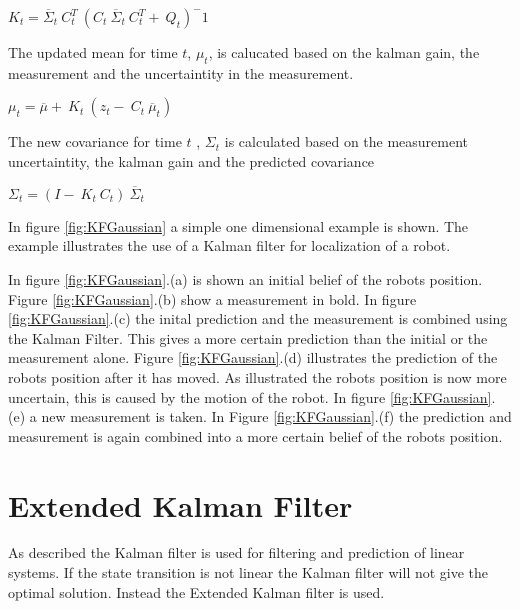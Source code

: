 \begin{center}
$K_t = \overline{\Sigma}_t \ C^T_t \ (C_t \ \overline{\Sigma}_t \ C^T_t +\ Q_t )^-1$ \\
\end{center}	

The updated mean for time $t$, $\mu_t$, is calucated based on the kalman gain, the measurement and the uncertaintity in the measurement.

\begin{center}
	$\mu_t =  \overline{\mu} + \ K_t \ (z_t- \ C_t \ \overline{\mu}_t)$ \\
\end{center}

The new covariance for time $t$ , $\Sigma_t$ is calculated based on the measurement uncertaintity, the kalman gain and the predicted covariance
\begin{center}
$\Sigma_t = (I - \ K_t \ C_t) \ \overline{\Sigma}_t$ \\
\end{center}


In figure \ref{fig:KFGaussian} a simple one dimensional example is shown. The example illustrates the use of a Kalman filter for localization of a robot. 

In figure \ref{fig:KFGaussian}.(a) is shown an initial belief of the robots position. Figure \ref{fig:KFGaussian}.(b) show a measurement in bold. In figure \ref{fig:KFGaussian}.(c) the inital prediction and the measurement is combined using the Kalman Filter. This gives a more certain prediction than the initial or the measurement alone. Figure \ref{fig:KFGaussian}.(d) illustrates the prediction of the robots position after it has moved. As illustrated the robots position is now more uncertain, this is caused by the motion of the robot. In figure \ref{fig:KFGaussian}.(e) a new measurement is taken. In Figure \ref{fig:KFGaussian}.(f) the prediction and measurement is again combined into a more certain belief of the robots position.


\section{Extended Kalman Filter}
As described the Kalman filter is used for filtering and prediction of linear systems. If the state transition is not linear the Kalman filter will not give the optimal solution. Instead the Extended Kalman filter is used.
